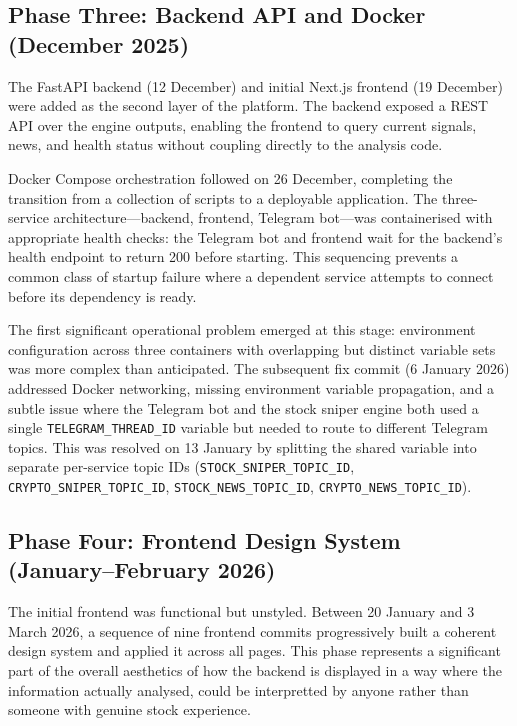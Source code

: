 \documentclass[12pt,a4paper]{article}
\begin{document}
\subsection{Phase Three: Backend API and Docker (December 2025)}

The FastAPI backend (12 December) and initial Next.js frontend (19 December) were added as the second layer of the platform. The backend exposed a REST API over the engine outputs, enabling the frontend to query current signals, news, and health status without coupling directly to the analysis code.

Docker Compose orchestration followed on 26 December, completing the transition from a collection of scripts to a deployable application. The three-service architecture---backend, frontend, Telegram bot---was containerised with appropriate health checks: the Telegram bot and frontend wait for the backend's health endpoint to return 200 before starting. This sequencing prevents a common class of startup failure where a dependent service attempts to connect before its dependency is ready.

The first significant operational problem emerged at this stage: environment configuration across three containers with overlapping but distinct variable sets was more complex than anticipated. The subsequent fix commit (6 January 2026) addressed Docker networking, missing environment variable propagation, and a subtle issue where the Telegram bot and the stock sniper engine both used a single \texttt{TELEGRAM\_THREAD\_ID} variable but needed to route to different Telegram topics. This was resolved on 13 January by splitting the shared variable into separate per-service topic IDs (\texttt{STOCK\_SNIPER\_TOPIC\_ID}, \texttt{CRYPTO\_SNIPER\_TOPIC\_ID}, \texttt{STOCK\_NEWS\_TOPIC\_ID}, \texttt{CRYPTO\_NEWS\_TOPIC\_ID}).

\subsection{Phase Four: Frontend Design System (January--February 2026)}

The initial frontend was functional but unstyled. Between 20 January and 3 March 2026, a sequence of nine frontend commits progressively built a coherent design system and applied it across all pages. This phase represents a significant part of the overall aesthetics of how the backend is displayed in a way where the information actually analysed, could be interpretted by anyone rather than someone with genuine stock experience.
\end{document}
